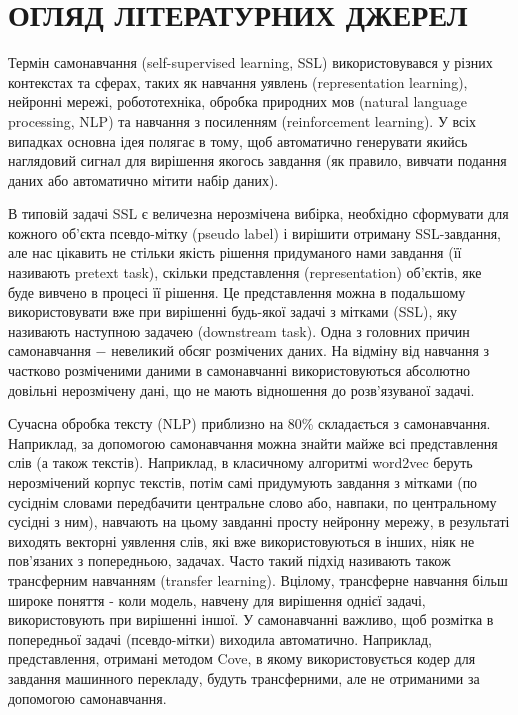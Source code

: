 \section{ОГЛЯД ЛІТЕРАТУРНИХ ДЖЕРЕЛ}
\label{sec:Theory}

Термін самонавчання (self-supervised learning, SSL) використовувався у різних контекстах та сферах, таких як навчання уявлень (representation learning), нейронні мережі, робототехніка, обробка природних мов (natural language processing, NLP) та навчання з посиленням (reinforcement learning). У всіх випадках основна ідея полягає в тому, щоб автоматично генерувати якийсь наглядовий сигнал для вирішення якогось завдання (як правило, вивчати подання даних або автоматично мітити набір даних).

В типовій задачі SSL є величезна нерозмічена вибірка, необхідно сформувати для кожного об'єкта псевдо-мітку (pseudo label) і вирішити отриману SSL-завдання, але нас цікавить не стільки якість рішення придуманого нами завдання (її називають pretext task), скільки представлення (representation) об'єктів, яке буде вивчено в процесі її рішення. Це представлення можна в подальшому використовувати вже при вирішенні будь-якої задачі з мітками (SSL), яку називають наступною задачею (downstream task). Одна з головних причин самонавчання $-$ невеликий обсяг розмічених даних. На відміну від навчання з частково розміченими даними в самонавчанні використовуються абсолютно довільні нерозмічену дані, що не мають відношення до розв'язуваної задачі.

Сучасна обробка тексту (NLP) приблизно на 80\% складається з самонавчання. Наприклад, за допомогою самонавчання можна знайти майже всі представлення слів (а також текстів). Наприклад, в класичному алгоритмі word2vec беруть нерозмічений корпус текстів, потім самі придумують завдання з мітками (по сусіднім словами передбачити центральне слово або, навпаки, по центральному сусідні з ним), навчають на цьому завданні просту нейронну мережу, в результаті виходять векторні уявлення слів, які вже використовуються в інших, ніяк не пов'язаних з попередньою, задачах. Часто такий підхід називають також трансферним навчанням (transfer learning). Вцілому, трансферне навчання більш широке поняття - коли модель, навчену для вирішення однієї задачі, використовують при вирішенні іншої. У самонавчанні важливо, щоб розмітка в попередньої задачі (псевдо-мітки) виходила автоматично. Наприклад, представлення, отримані методом Cove, в якому використовується кодер для завдання машинного перекладу, будуть трансферними, але не отриманими за допомогою самонавчання.


